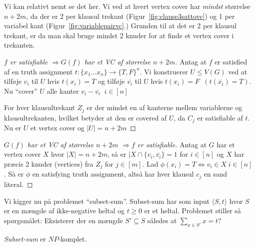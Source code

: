 Vi kan relativt nemt se det her. Vi ved at hvert vertex cover har \textit{mindst} størrelse $n+2m$, da der er 2 per klausul trekant (Figur~\ref{fig:clause3sattovc}) og 1 per variabel kant (Figur~\ref{fig:variablepairvc}.) Grunden til at det er 2 per klausul trekant, er da man skal bruge mindst 2 knuder for at finde et vertex cover i trekanten.

\begin{proof}[$f$ er satisfiable $\Rightarrow G(f)$ har et VC  af størrelse $n+2m$]
  Antag at $f$ er satisfied af en truth assignment $t : \{x_{1} \ldots x_{n}\} \rightarrow \{T, F\}^{n}$. Vi konstruerer $U \le V(G)$ ved at tilføje $v_{i}$ til $U$ hvis $t(x_{i}) = T$ og tilføje $\overline{v_{i}}$ til $U$ hvis $t(x_{i}) = F\;\;(t(\overline{x_i}) = T)$. Nu ``cover'' $U$ alle kanter $v_{i} - \overline{v_i}\;\; i \in [n]$

  For hver klausultrekant $Z_{j}$ er der mindst en af kanterne mellem variablerne og klausultrekanten, hvilket betyder at den er covered af $U$, da $C_{j}$ er satisfiable af $t$. Nu er $U$ et vertex cover og $|U| = n +2m$
\end{proof}

\begin{proof}[$G(f)$ har et VC af størrelse $n+2m$ \(\Rightarrow f\)  er satisfiable]
Antag at $G$ har et vertex cover $X$ hvor $|X| = n+2m$, så er $|X \cap \{v_{i}, \overline{v_{i}}\} = 1$ for $i \in [n]$ og $X$ har præcis 2 knuder (vertices) fra $Z_{j}$ for $j \in [m]$. Lad $\phi(x_{i}) = T \iff v_{i} \in X \; i \in [n]$. Så er $\phi$ en satisfying truth assignment, altså har hver klausul $c_{j}$ en sand literal.
\end{proof}


Vi kigger nu på problemet ``subset-sum''. Subset-sum har som input $\langle S, t \rangle$ hvor $S$  er en mængde af ikke-negative heltal og $t \ge 0$ er et heltal. Problemet stiller så spørgsmålet: Eksisterer der en mængde $S' \subseteq S$ således at $\sum_{x \in S'}x = t$?

\begin{theorem}
\textit{Subset-sum} er $NP$-komplet.
\end{theorem}

